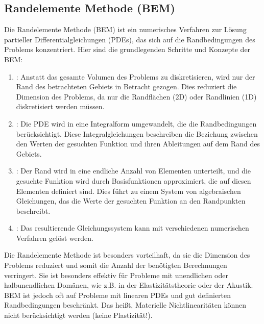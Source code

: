 \documentclass[letterpaper,10pt,german]{jupyterBook}
\begin{document}
\subsection{Randelemente Methode (BEM)}
\label{\detokenize{chapters/chapter1/Einf_xfchrung_Loesungsverfahren:randelemente-methode-bem}}
\sphinxAtStartPar
Die Randelemente Methode (BEM) ist ein numerisches Verfahren zur Lösung partieller Differentialgleichungen (PDEs), das sich auf die Randbedingungen des Problems konzentriert. Hier sind die grundlegenden Schritte und Konzepte der BEM:
\begin{enumerate}
%
\item {} 
\sphinxAtStartPar
{}: Anstatt das gesamte Volumen des Problems zu diskretisieren, wird nur der Rand des betrachteten Gebiets in Betracht gezogen. Dies reduziert die Dimension des Problems, da nur die Randflächen (2D) oder Randlinien (1D) diskretisiert werden müssen.

\item {} 
\sphinxAtStartPar
{}: Die PDE wird in eine Integralform umgewandelt, die die Randbedingungen berücksichtigt. Diese Integralgleichungen beschreiben die Beziehung zwischen den Werten der gesuchten Funktion und ihren Ableitungen auf dem Rand des Gebiets.

\item {} 
\sphinxAtStartPar
{}: Der Rand wird in eine endliche Anzahl von Elementen unterteilt, und die gesuchte Funktion wird durch Basisfunktionen approximiert, die auf diesen Elementen definiert sind. Dies führt zu einem System von algebraischen Gleichungen, das die Werte der gesuchten Funktion an den Randpunkten beschreibt.

\item {} 
\sphinxAtStartPar
{}: Das resultierende Gleichungssystem kann mit verschiedenen numerischen Verfahren gelöst werden.

\end{enumerate}

\sphinxAtStartPar
Die Randelemente Methode ist besonders vorteilhaft, da sie die Dimension des Problems reduziert und somit die Anzahl der benötigten Berechnungen verringert. Sie ist besonders effektiv für Probleme mit unendlichen oder halbunendlichen Domänen, wie z.B. in der Elastizitätstheorie oder der Akustik. BEM ist jedoch oft auf Probleme mit linearen PDEs und gut definierten Randbedingungen beschränkt. Das heißt, Materielle Nichtlinearitäten können nicht berücksichtigt werden (keine Plastizität!).
\end{document}
